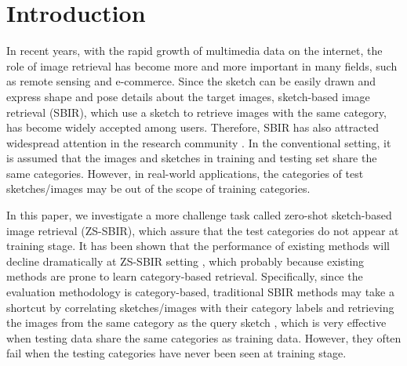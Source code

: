 \documentclass[10pt,twocolumn,letterpaper]{article}
\begin{document}
\section{Introduction}
In recent years, with the rapid growth of multimedia data on the internet, the role of image retrieval has become more and more important in many fields, such as remote sensing and e-commerce. 
Since the sketch can be easily drawn and express shape and pose details about the target images, sketch-based image retrieval (SBIR), which use a sketch to retrieve images with the same category, has become widely accepted among users. 
Therefore, SBIR has also attracted widespread attention in the research community \cite{del1997visual, cao2010mindfinder, eitz2010evaluation, eitz2010sketch, cao2011edgel, hu2011bag, zhou2012sketch, hu2013performance, cao2013sym, parui2014similarity, james2014reenact, wang2015sketch, saavedra2015sketch, li2016fine, yu2016sketch, qi2016sketch, sangkloy2016sketchy, lu2018learning}. 
In the conventional setting, it is assumed that the images and sketches in training and testing set share the same categories.
However, in real-world applications, the categories of test sketches/images may be out of the scope of training categories.

In this paper, we investigate a more challenge task called zero-shot sketch-based image retrieval (ZS-SBIR), which assure that the test categories do not appear at training stage. 
It has been shown that the performance of existing methods will decline dramatically at ZS-SBIR setting \cite{yelamarthi2018zero}, which probably because existing methods are prone to learn category-based retrieval.
Specifically, since the evaluation methodology is category-based, traditional SBIR methods may take a shortcut by correlating sketches/images with their category labels and retrieving the images from the same category as the query sketch \cite{yelamarthi2018zero}, which is very effective when testing data share the same categories as training data. 
However, they often fail when the testing categories have never been seen at training stage.
\end{document}
